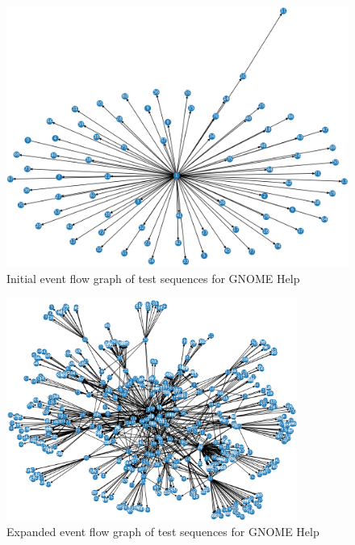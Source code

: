 \begin{figure}[H]
	\centering
	\includegraphics[width=1\textwidth,clip]{obrazky-figures/yelp_n_start.png}
	\caption{Initial event flow graph of test sequences for GNOME Help}
	\label{yelp_start}
\end{figure}

\begin{figure}[H]
	\centering
	\includegraphics[width=0.85\textwidth,clip]{obrazky-figures/yelp_n_final.png}
	\caption{Expanded event flow graph of test sequences for GNOME Help}
	\label{yelp_end}
\end{figure}

